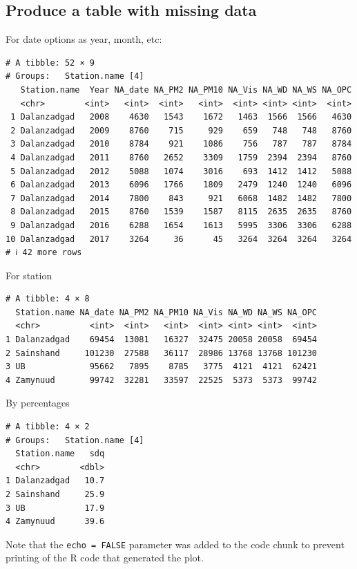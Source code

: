 \documentclass[
]{agujournal2019}
\begin{document}
\subsection{Produce a table with missing
data}\label{produce-a-table-with-missing-data-1}

For date options as year, month, etc:

\begin{verbatim}
# A tibble: 52 × 9
# Groups:   Station.name [4]
   Station.name  Year NA_date NA_PM2 NA_PM10 NA_Vis NA_WD NA_WS NA_OPC
   <chr>        <int>   <int>  <int>   <int>  <int> <int> <int>  <int>
 1 Dalanzadgad   2008    4630   1543    1672   1463  1566  1566   4630
 2 Dalanzadgad   2009    8760    715     929    659   748   748   8760
 3 Dalanzadgad   2010    8784    921    1086    756   787   787   8784
 4 Dalanzadgad   2011    8760   2652    3309   1759  2394  2394   8760
 5 Dalanzadgad   2012    5088   1074    3016    693  1412  1412   5088
 6 Dalanzadgad   2013    6096   1766    1809   2479  1240  1240   6096
 7 Dalanzadgad   2014    7800    843     921   6068  1482  1482   7800
 8 Dalanzadgad   2015    8760   1539    1587   8115  2635  2635   8760
 9 Dalanzadgad   2016    6288   1654    1613   5995  3306  3306   6288
10 Dalanzadgad   2017    3264     36      45   3264  3264  3264   3264
# ℹ 42 more rows
\end{verbatim}

For station

\begin{verbatim}
# A tibble: 4 × 8
  Station.name NA_date NA_PM2 NA_PM10 NA_Vis NA_WD NA_WS NA_OPC
  <chr>          <int>  <int>   <int>  <int> <int> <int>  <int>
1 Dalanzadgad    69454  13081   16327  32475 20058 20058  69454
2 Sainshand     101230  27588   36117  28986 13768 13768 101230
3 UB             95662   7895    8785   3775  4121  4121  62421
4 Zamynuud       99742  32281   33597  22525  5373  5373  99742
\end{verbatim}

By percentages

\begin{verbatim}
# A tibble: 4 × 2
# Groups:   Station.name [4]
  Station.name   sdq
  <chr>        <dbl>
1 Dalanzadgad   10.7
2 Sainshand     25.9
3 UB            17.9
4 Zamynuud      39.6
\end{verbatim}

Note that the \texttt{echo\ =\ FALSE} parameter was added to the code
chunk to prevent printing of the R code that generated the plot.
\end{document}
